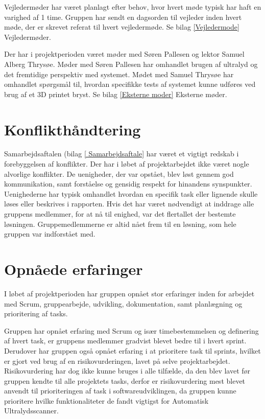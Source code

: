 Vejledermøder har været planlagt efter behov, hvor hvert møde typisk har haft en varighed af 1 time. Gruppen har sendt en dagsorden til vejleder inden hvert møde, der er skrevet referat til hvert vejledermøde. Se bilag \ref{Vejledermode} Vejledermøder.
 
Der har i projektperioden været møder med Søren Pallesen og lektor Samuel Alberg Thrysøe. Møder med Søren Pallesen har omhandlet brugen af ultralyd og det fremtidige perspektiv med systemet. Mødet med Samuel Thrysøe har omhandlet spørgsmål til, hvordan specifikke tests af systemet kunne udføres ved brug af et 3D printet bryst. Se bilag \ref{Eksterne moder} Eksterne møder. 

\section{Konflikthåndtering}
Samarbejdsaftalen (bilag \ref{ Samarbejdsaftale} har været et vigtigt redskab i forebyggelsen af konflikter. Der har i løbet af projektarbejdet ikke været nogle alvorlige konflikter.  De uenigheder, der var opstået, blev løst gennem god kommunikation, samt forståelse og gensidig respekt for hinandens synspunkter. Uenighederne har typisk omhandlet hvordan en specifik task eller lignende skulle løses eller beskrives i rapporten. Hvis det har været nødvendigt at inddrage alle gruppens medlemmer, for at nå til enighed, var det flertallet der bestemte løsningen. Gruppemedlemmerne er altid nået frem til en løsning, som hele gruppen var indforstået med.

\section{Opnåede erfaringer}
I løbet af projektperioden har gruppen opnået stor erfaringer inden for arbejdet med Scrum, gruppearbejde, udvikling, dokumentation, samt planlægning og prioritering af tasks. 

Gruppen har opnået erfaring med Scrum og især timebestemmelsen og definering af hvert task, er gruppens medlemmer gradvist blevet bedre til i hvert sprint. Derudover har gruppen også opnået erfaring i at prioritere task til sprints, hvilket er gjort ved brug af en risikovurderingen, lavet på selve projektarbejdet. Risikovurdering har dog ikke kunne bruges i alle tilfælde, da den blev lavet før gruppen kendte til alle projektets tasks, derfor er risikovurdering mest blevet anvendt til prioriteringen af task i softwareudviklingen, da gruppen kunne prioritere hvilke funktionaliteter de fandt vigtigst for Automatisk Ultralydsscanner. 

